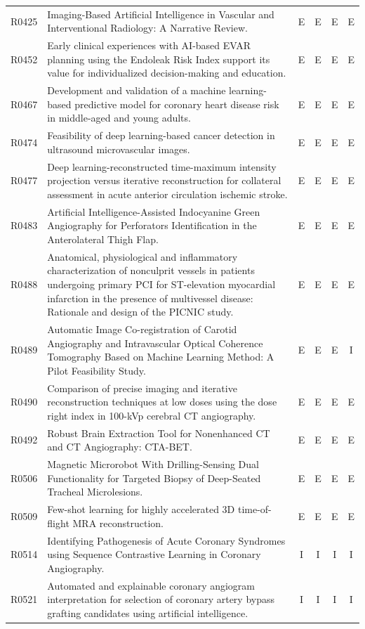 \begin{longtable}{@{}l p{8.6cm} c c c c@{}}
R0425 & Imaging-Based Artificial Intelligence in Vascular and Interventional Radiology: A Narrative Review. & E & E & E & E \\
R0452 & Early clinical experiences with AI-based EVAR planning using the Endoleak Risk Index support its value for individualized decision-making and education. & E & E & E & E \\
R0467 & Development and validation of a machine learning-based predictive model for coronary heart disease risk in middle-aged and young adults. & E & E & E & E \\
R0474 & Feasibility of deep learning-based cancer detection in ultrasound microvascular images. & E & E & E & E \\
R0477 & Deep learning-reconstructed time-maximum intensity projection versus iterative reconstruction for collateral assessment in acute anterior circulation ischemic stroke. & E & E & E & E \\
R0483 & Artificial Intelligence-Assisted Indocyanine Green Angiography for Perforators Identification in the Anterolateral Thigh Flap. & E & E & E & E \\
R0488 & Anatomical, physiological and inflammatory characterization of nonculprit vessels in patients undergoing primary PCI for ST-elevation myocardial infarction in the presence of multivessel disease: Rationale and design of the PICNIC study. & E & E & E & E \\
R0489 & Automatic Image Co-registration of Carotid Angiography and Intravascular Optical Coherence Tomography Based on Machine Learning Method: A Pilot Feasibility Study. & E & E & E & I \\
R0490 & Comparison of precise imaging and iterative reconstruction techniques at low doses using the dose right index in 100-kVp cerebral CT angiography. & E & E & E & E \\
R0492 & Robust Brain Extraction Tool for Nonenhanced CT and CT Angiography: CTA-BET. & E & E & E & E \\
R0506 & Magnetic Microrobot With Drilling-Sensing Dual Functionality for Targeted Biopsy of Deep-Seated Tracheal Microlesions. & E & E & E & E \\
R0509 & Few-shot learning for highly accelerated 3D time-of-flight MRA reconstruction. & E & E & E & E \\
R0514 & Identifying Pathogenesis of Acute Coronary Syndromes using Sequence Contrastive Learning in Coronary Angiography. & I & I & I & I \\
R0521 & Automated and explainable coronary angiogram interpretation for selection of coronary artery bypass grafting candidates using artificial intelligence. & I & I & I & I \\

\end{longtable}
